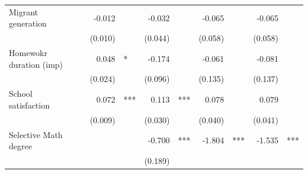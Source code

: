 \documentclass{article}
\begin{document}
\begin{table}[!h]
\begin{tabular}{lllllllllll}
\multicolumn{1}{l}{Migrant generation} &
  \multicolumn{1}{r}{} &
  \multicolumn{1}{l}{} &
  \multicolumn{1}{r}{-0.012} &
  \multicolumn{1}{l}{} &
  \multicolumn{1}{r}{-0.032} &
  \multicolumn{1}{l}{} &
  \multicolumn{1}{r}{-0.065} &
  \multicolumn{1}{l}{} &
  \multicolumn{1}{r}{-0.065} &
  \multicolumn{1}{l}{} \\
\multicolumn{1}{l}{} &
  \multicolumn{1}{r}{} &
  \multicolumn{1}{l}{} &
  \multicolumn{1}{r}{(0.010)} &
  \multicolumn{1}{l}{} &
  \multicolumn{1}{r}{(0.044)} &
  \multicolumn{1}{l}{} &
  \multicolumn{1}{r}{(0.058)} &
  \multicolumn{1}{l}{} &
  \multicolumn{1}{r}{(0.058)} &
  \multicolumn{1}{l}{} \\
\multicolumn{1}{l}{Homewokr duration (imp)} &
  \multicolumn{1}{r}{} &
  \multicolumn{1}{l}{} &
  \multicolumn{1}{r}{0.048} &
  \multicolumn{1}{l}{*} &
  \multicolumn{1}{r}{-0.174} &
  \multicolumn{1}{l}{} &
  \multicolumn{1}{r}{-0.061} &
  \multicolumn{1}{l}{} &
  \multicolumn{1}{r}{-0.081} &
  \multicolumn{1}{l}{} \\
\multicolumn{1}{l}{} &
  \multicolumn{1}{r}{} &
  \multicolumn{1}{l}{} &
  \multicolumn{1}{r}{(0.024)} &
  \multicolumn{1}{l}{} &
  \multicolumn{1}{r}{(0.096)} &
  \multicolumn{1}{l}{} &
  \multicolumn{1}{r}{(0.135)} &
  \multicolumn{1}{l}{} &
  \multicolumn{1}{r}{(0.137)} &
  \multicolumn{1}{l}{} \\
\multicolumn{1}{l}{School satisfaction} &
  \multicolumn{1}{r}{} &
  \multicolumn{1}{l}{} &
  \multicolumn{1}{r}{0.072} &
  \multicolumn{1}{l}{***} &
  \multicolumn{1}{r}{0.113} &
  \multicolumn{1}{l}{***} &
  \multicolumn{1}{r}{0.078} &
  \multicolumn{1}{l}{} &
  \multicolumn{1}{r}{0.079} &
  \multicolumn{1}{l}{} \\
\multicolumn{1}{l}{} &
  \multicolumn{1}{r}{} &
  \multicolumn{1}{l}{} &
  \multicolumn{1}{r}{(0.009)} &
  \multicolumn{1}{l}{} &
  \multicolumn{1}{r}{(0.030)} &
  \multicolumn{1}{l}{} &
  \multicolumn{1}{r}{(0.040)} &
  \multicolumn{1}{l}{} &
  \multicolumn{1}{r}{(0.041)} &
  \multicolumn{1}{l}{} \\
\multicolumn{1}{l}{Selective Math degree} &
  \multicolumn{1}{r}{} &
  \multicolumn{1}{l}{} &
  \multicolumn{1}{r}{} &
  \multicolumn{1}{l}{} &
  \multicolumn{1}{r}{-0.700} &
  \multicolumn{1}{l}{***} &
  \multicolumn{1}{r}{-1.804} &
  \multicolumn{1}{l}{***} &
  \multicolumn{1}{r}{-1.535} &
  \multicolumn{1}{l}{***} \\
\multicolumn{1}{l}{} &
  \multicolumn{1}{r}{} &
  \multicolumn{1}{l}{} &
  \multicolumn{1}{r}{} &
  \multicolumn{1}{l}{} &
  \multicolumn{1}{r}{(0.189)} &

\end{tabular}
\end{table}
\end{document}
